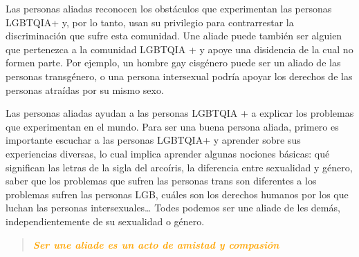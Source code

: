 \documentclass[12pt,openany]{book}
\begin{document}
Las personas aliadas reconocen los obstáculos que experimentan las personas LGBTQIA+ y, por lo tanto, usan su privilegio para contrarrestar la discriminación que sufre esta comunidad. Une aliade puede también ser alguien que pertenezca a la comunidad LGBTQIA + y apoye una disidencia de la cual no formen parte. Por ejemplo, un hombre gay cisgénero puede ser un aliado de las personas transgénero, o una persona intersexual podría apoyar los derechos de las personas atraídas por su mismo sexo.

Las personas aliadas ayudan a las personas LGBTQIA + a explicar los problemas que experimentan en el mundo. Para ser una buena persona aliada, primero es importante escuchar a las personas LGBTQIA+ y aprender sobre sus experiencias diversas, lo cual implica aprender algunas nociones básicas: qué significan las letras de la sigla del arcoíris, la diferencia entre sexualidad y género, saber que los problemas que sufren las personas trans son diferentes a los problemas sufren las personas LGB, cuáles son los derechos humanos por los que luchan las personas intersexuales… Todes podemos ser une aliade de les demás, independientemente de su sexualidad o género.

\begin{figure}[h]
    \centering
\end{figure}

\begin{quote}
\centering
\doublespacing
\textit{\Large \textcolor{orange}{\textbf{Ser une aliade es un acto de amistad y compasión}}}
\end{quote}
\end{document}
